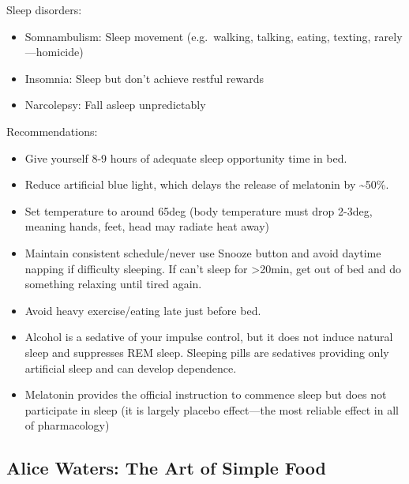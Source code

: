 \documentclass[
]{article}
\begin{document}
Sleep disorders:

\begin{itemize}
\item
  Somnambulism: Sleep movement (e.g.~walking, talking, eating, texting,
  rarely---homicide)
\item
  Insomnia: Sleep but don't achieve restful rewards
\item
  Narcolepsy: Fall asleep unpredictably
\end{itemize}

Recommendations:

\begin{itemize}
\item
  Give yourself 8-9 hours of adequate sleep opportunity time in bed.
\item
  Reduce artificial blue light, which delays the release of melatonin by
  \textasciitilde50\%.
\item
  Set temperature to around 65deg (body temperature must drop 2-3deg,
  meaning hands, feet, head may radiate heat away)
\item
  Maintain consistent schedule/never use Snooze button and avoid daytime
  napping if difficulty sleeping. If can't sleep for \textgreater20min,
  get out of bed and do something relaxing until tired again.
\item
  Avoid heavy exercise/eating late just before bed.
\item
  Alcohol is a sedative of your impulse control, but it does not induce
  natural sleep and suppresses REM sleep. Sleeping pills are sedatives
  providing only artificial sleep and can develop dependence.
\item
  Melatonin provides the official instruction to commence sleep but does
  not participate in sleep (it is largely placebo effect---the most
  reliable effect in all of pharmacology)
\end{itemize}

\hypertarget{alice-waters-the-art-of-simple-food}{%
\subsection{Alice Waters: The Art of Simple
Food}\label{alice-waters-the-art-of-simple-food}}
\end{document}
